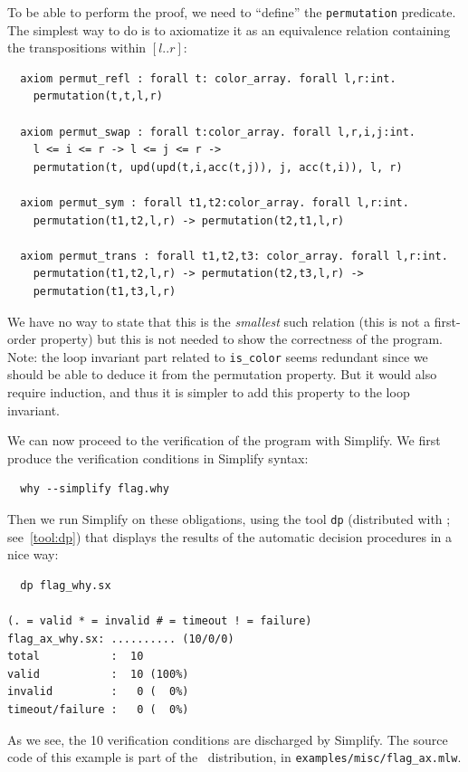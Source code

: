 \documentclass[a4paper,12pt]{report}
\begin{document}
To be able to perform the proof, we need to ``define'' the
\texttt{permutation} predicate.  The simplest way to do is to
axiomatize it as an equivalence relation containing the transpositions
within $[l..r]$:
\begin{verbatim}
  axiom permut_refl : forall t: color_array. forall l,r:int.
    permutation(t,t,l,r)

  axiom permut_swap : forall t:color_array. forall l,r,i,j:int.
    l <= i <= r -> l <= j <= r ->
    permutation(t, upd(upd(t,i,acc(t,j)), j, acc(t,i)), l, r)

  axiom permut_sym : forall t1,t2:color_array. forall l,r:int.
    permutation(t1,t2,l,r) -> permutation(t2,t1,l,r)

  axiom permut_trans : forall t1,t2,t3: color_array. forall l,r:int.
    permutation(t1,t2,l,r) -> permutation(t2,t3,l,r) -> 
    permutation(t1,t3,l,r)
\end{verbatim}
We have no way to state that this is the \emph{smallest} such relation
(this is not a first-order property) but this is not needed to show
the correctness of the program. Note: the loop invariant part related
to \texttt{is\_color} seems redundant since we should be able to
deduce it from the permutation property. But it would also require
induction, and thus it is simpler to add this property to the loop invariant.

We can now proceed to the verification of the program with
Simplify. We first produce the verification conditions in Simplify
syntax: 
\begin{verbatim}
  why --simplify flag.why
\end{verbatim}
Then we run Simplify on these obligations, using the tool \texttt{dp}
(distributed with \why; see~\ref{tool:dp}) that displays the results
of the automatic decision procedures in a nice way:
\begin{verbatim}
  dp flag_why.sx

(. = valid * = invalid # = timeout ! = failure)
flag_ax_why.sx: .......... (10/0/0)
total           :  10
valid           :  10 (100%)
invalid         :   0 (  0%)
timeout/failure :   0 (  0%)
\end{verbatim}
As we see, the 10 verification conditions are discharged by Simplify.
The source code of this example is part of the \why\ distribution, in
\texttt{examples/misc/flag\_ax.mlw}. 
\end{document}

